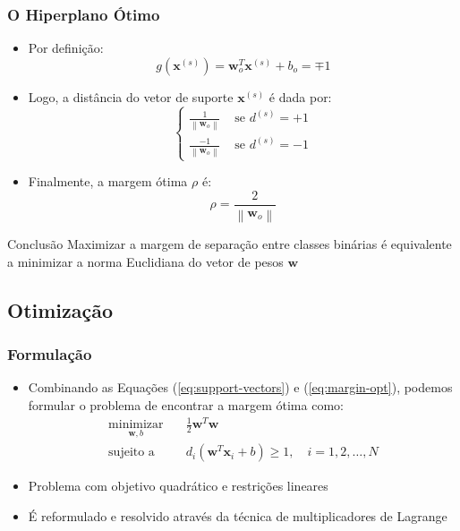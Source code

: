\documentclass{beamer}
\begin{document}
\begin{frame}
	\frametitle{O Hiperplano Ótimo}
	
	\begin{itemize}
		\item Por definição:
		\begin{equation}
			g(\textbf{x}^{(s)}) = \textbf{w}^T_o\textbf{x}^{(s)} + b_o = \mp 1
			\label{eq:support-vectors}
		\end{equation}	
		\item Logo, a distância do vetor de suporte $\textbf{x}^{(s)}$ é dada por:
		\begin{equation}
		\begin{cases}
			\frac{1}{\left \| \textbf{w}_o \right \|} & \text{ se } d^{(s)}= +1\\ 
			\frac{-1}{\left \| \textbf{w}_o \right \|}& \text{ se } d^{(s)}= -1 
		\end{cases}
		\end{equation}
		\item Finalmente, a margem ótima $\rho$ é:
		\begin{equation}
			\rho = \frac{2}{\left \| \textbf{w}_o \right \|}
			\label{eq:margin-opt}
		\end{equation}
	\end{itemize}	
	
	\begin{block}{Conclusão}
		Maximizar a margem de separação entre classes binárias é equivalente a minimizar a norma Euclidiana do vetor de pesos $\textbf{w}$
	\end{block}

\end{frame}


\subsection{Otimização}

\begin{frame}
	\frametitle{Formulação}
	\begin{itemize}
		\item Combinando as Equações (\ref{eq:support-vectors}) e (\ref{eq:margin-opt}), podemos formular o problema de encontrar a margem ótima como:
		\begin{align}
			\underset{\textbf{w},b}{\text{minimizar}} \quad & \frac{1}{2}\textbf{w}^T\textbf{w} \\ 
			\text{sujeito a} \quad & d_i(\textbf{w}^T\textbf{x}_i + b) \geq 1, \quad i=1,2,\dots,N  \nonumber
			\label{eq:opt-prob1}
		\end{align} 
		\item Problema com objetivo quadrático e restrições lineares
		\item É reformulado e resolvido através da técnica de multiplicadores de Lagrange \cite{haykin}
	\end{itemize}
	
\end{frame}
\end{document}
